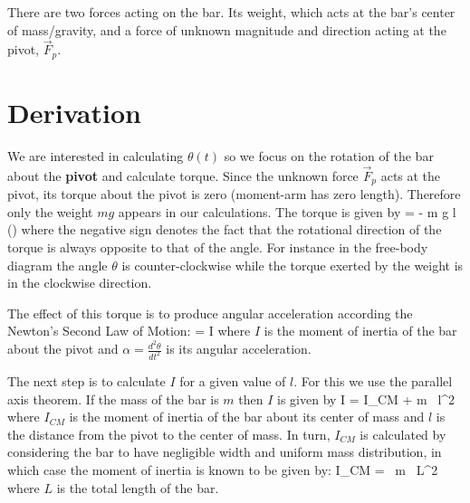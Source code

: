    \begin{center}
      
   \end{center}

   There are two forces acting on the bar. Its weight, which acts at the bar's center of mass/gravity, and a force of unknown magnitude and direction acting at the pivot, $\vec{F}_p$.
   
\section{Derivation}
   
   We are interested in calculating $\theta(t)$ so we focus on the rotation of the bar about the \textbf{pivot} and calculate torque. Since the unknown force $\vec{F}_p$ acts at the pivot, its torque about the pivot is zero (moment-arm has zero length). Therefore only the weight $m g$ appears in our calculations. The torque is given by
   \beq
      \tau = - m g l \sin(\theta)
   \eeq
   where the negative sign denotes the fact that the rotational direction of the torque is always opposite to that of the angle. For instance in the free-body diagram the angle $\theta$ is counter-clockwise while the torque exerted by the weight is in the clockwise direction.

   The effect of this torque is to produce angular acceleration according the Newton's Second Law of Motion:
   \beq
      \tau = I \alpha
   \eeq
   where $I$ is the moment of inertia of the bar about the pivot and $\alpha = \frac{d^2 \theta}{dt^2}$ is its angular acceleration.

   \vspace{\baselineskip} 
   The next step is to calculate $I$ for a given value of $l$. For this we use the parallel axis theorem. If the mass of the bar is $m$ then $I$ is given by
   \beq
      I = I_{CM} + m \, l^2
   \eeq
   where $I_{CM}$ is the moment of inertia of the bar about its center of mass and $l$ is the distance from the pivot to the center of mass. In turn, $I_{CM}$ is calculated by considering the bar to have negligible width and uniform mass distribution, in which case the moment of inertia is known to be given by:
   \beq
      I_{CM} =  \, m \, L^2
   \eeq
   where $L$ is the total length of the bar.
